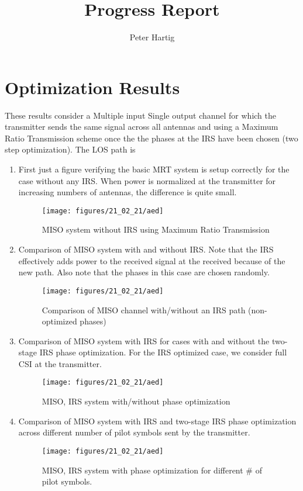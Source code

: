 \documentclass[12pt,a4paper]{article}
\title{Progress Report}
\author{Peter Hartig}
\begin{document}
\maketitle
\tableofcontents

\section{Optimization Results}\label{overview}
These results consider a Multiple input Single output channel for which the transmitter sends the same signal across all antennas and using a Maximum Ratio Transmission scheme once the the phases at the IRS have been chosen (two step optimization). The LOS path is $ $
\begin{enumerate}
\item 
First just a figure verifying the basic MRT system is setup correctly for the case without any IRS.
When power is normalized at the transmitter for increasing numbers of antennas, the difference is quite small. 
	\begin{figure}[H]
	\texttt{[image: figures/21\_02\_21/aed]}
	  \caption{MISO system without IRS using Maximum Ratio Transmission}
	  \label{basic_MRT}
	\end{figure}
	
\item 
Comparison of MISO system with and without IRS. Note that the IRS effectively adds power to the received signal at the received because of the new path.
Also note that the phases in this case are chosen randomly.
	\begin{figure}[H]
	\texttt{[image: figures/21\_02\_21/aed]}
	  \caption{ Comparison of MISO channel with/without an IRS path (non-optimized phases)}
	  \label{AED}
	\end{figure}	
	
\item 
Comparison of MISO system with IRS for cases with and without the two-stage IRS phase optimization. For the IRS optimized case, we consider full CSI at the transmitter.
	\begin{figure}[H]
	\texttt{[image: figures/21\_02\_21/aed]}
	  \caption{MISO, IRS system with/without phase optimization}
	  \label{AED}
	\end{figure}	

\item 
Comparison of MISO system with IRS and two-stage IRS phase optimization across different number of pilot symbols sent by the transmitter. 
	\begin{figure}[H]
	\texttt{[image: figures/21\_02\_21/aed]}
	  \caption{MISO, IRS system with phase optimization for different # of pilot symbols.}
	  \label{AED}
	\end{figure}		

\end{enumerate}


\end{document}
